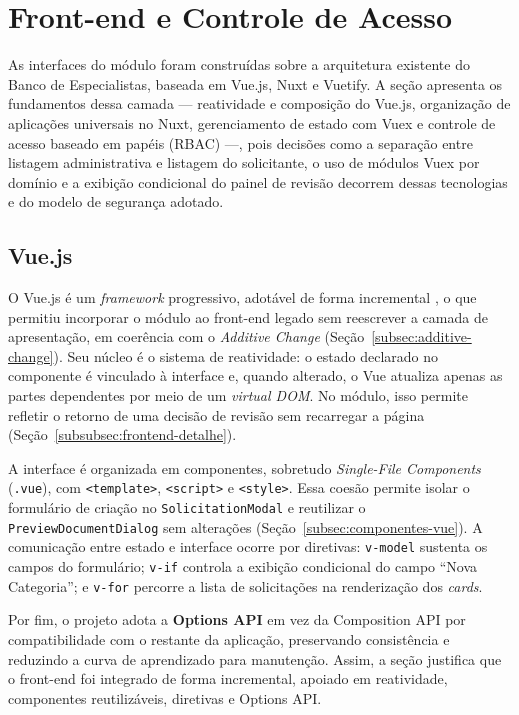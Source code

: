 \section{Front-end e Controle de Acesso}
\label{sec:front-end-controle-acesso}

As interfaces do módulo foram construídas sobre a arquitetura existente do Banco de
Especialistas, baseada em Vue.js, Nuxt e Vuetify. A seção apresenta os fundamentos dessa
camada --- reatividade e composição do Vue.js, organização de aplicações universais no
Nuxt, gerenciamento de estado com Vuex e controle de acesso baseado em papéis (RBAC)
---, pois decisões como a separação entre listagem administrativa e listagem do
solicitante, o uso de módulos Vuex por domínio e a exibição condicional do painel de
revisão decorrem dessas tecnologias e do modelo de segurança adotado.

\subsection{Vue.js}
\label{subsec:vue-js}

O Vue.js é um \textit{framework} progressivo, adotável de forma incremental
\cite{vuejs2024}, o que permitiu incorporar o módulo ao front-end legado sem reescrever
a camada de apresentação, em coerência com o \textit{Additive Change}
(Seção~\ref{subsec:additive-change}). Seu núcleo é o sistema de reatividade: o estado
declarado no componente é vinculado à interface e, quando alterado, o Vue atualiza
apenas as partes dependentes por meio de um \textit{virtual DOM}. No módulo, isso
permite refletir o retorno de uma decisão de revisão sem recarregar a página
(Seção~\ref{subsubsec:frontend-detalhe}).

A interface é organizada em componentes, sobretudo \textit{Single-File Components}
(\texttt{.vue}), com \texttt{<template>}, \texttt{<script>} e \texttt{<style>}. Essa
coesão permite isolar o formulário de criação no \texttt{SolicitationModal} e reutilizar
o \texttt{PreviewDocumentDialog} sem alterações
(Seção~\ref{subsec:componentes-vue}). A comunicação entre estado e interface ocorre
por diretivas: \texttt{v-model} sustenta os campos do formulário; \texttt{v-if} controla
a exibição condicional do campo ``Nova Categoria''; e \texttt{v-for} percorre a lista de
solicitações na renderização dos \textit{cards}.

Por fim, o projeto adota a \textbf{Options API} em vez da Composition API por
compatibilidade com o restante da aplicação, preservando consistência e reduzindo a
curva de aprendizado para manutenção. Assim, a seção justifica que o front-end foi
integrado de forma incremental, apoiado em reatividade, componentes reutilizáveis,
diretivas e Options API.

